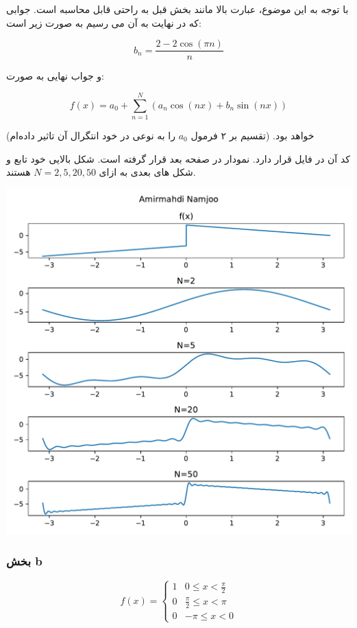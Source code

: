\documentclass[12pt]{article}
\begin{document}
با توجه به این موضوع، عبارت بالا مانند بخش قبل به راحتی قابل محاسبه است. جوابی که در نهایت به آن می رسیم به صورت زیر است:


$$\boxed{b_n = \frac{2-2 \cos (\pi  n)}{n}}$$


و جواب نهایی به صورت:

$$f(x) = a_0 + \sum_{n=1}^{N} (a_n \cos (n x) + b_n \sin (n x))$$

خواهد بود. (تقسیم بر ۲ فرمول $a_0$ را به نوعی در خود انتگرال آن تاثیر داده‌ام)

کد آن در فایل 
قرار دارد. نمودار در صفحه بعد قرار گرفته است. شکل بالایی خود تابع و شکل های بعدی به ازای $N=2,5,20,50$ هستند.

\begin{center}
	\includegraphics[width = 1.0 \textwidth]{images/1.pdf}
\end{center}


\newpage

\subsubsection{بخش b}

$$
f(x)=\left\{\begin{array}{lr}
	1 & 0 \leq x<\frac{\pi}{2} \\
	0 & \frac{\pi}{2} \leq x<\pi \\
	0 & -\pi \leq x<0
\end{array}\right.
$$
\end{document}
